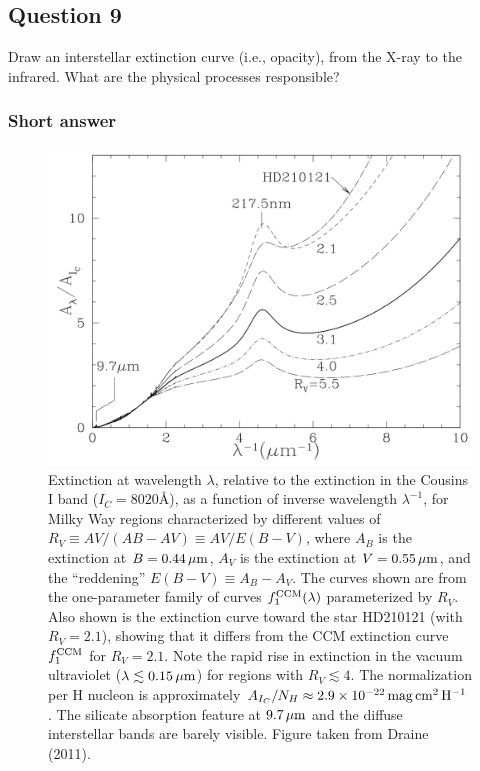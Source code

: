 \documentclass[a4paper,10pt]{article}
\begin{document}

\newpage
\subsection{Question 9}

Draw an interstellar extinction curve (i.e., opacity), from the X-ray to the infrared. What are the physical processes responsible?

\subsubsection{Short answer}

\begin{figure}[h!]
    \centering
    \includegraphics[width=12cm]{figures/ExtinctionCurve.png}
    \caption{\footnotesize{Extinction at wavelength $\lambda$, relative to the extinction in the Cousins I band ($I_C=8020$\AA), as a function of inverse wavelength $\lambda^{-1}$, for Milky Way regions characterized by different values of $R_V\equiv AV/(AB-AV)\equiv AV/E(B−V)$, where $A_B$ is the extinction at $B=0.44\,\mu{\rm m}$, $A_V$ is the extinction at $V=0.55\,\mu{\rm m}$, and the ``reddening'' $E(B−V)\equiv A_B−A_V$. The curves shown are from the one-parameter family of curves $f_1^{\rm CCM}(\lambda)$ parameterized by $R_V$. Also shown is the extinction curve toward the star HD210121 (with $R_V=2.1$), showing that it differs from the CCM extinction curve $f_1^{\rm CCM}$ for $R_V=2.1$. Note the rapid rise in extinction in the vacuum ultraviolet ($\lambda\lesssim0.15\,\mu{\rm m}$) for regions with $R_V\lesssim4$. The normalization per H nucleon is approximately $A_{I_C}/N_H\approx2.9\times10^{-22}\,{\rm mag\,cm^2\,H^{-1}}$. The silicate absorption feature at $9.7\,\mu{\rm m}$ and the diffuse interstellar bands are barely visible. Figure taken from Draine (2011).}}
    \label{fig:extinctioncurve}
\end{figure}
\end{document}
